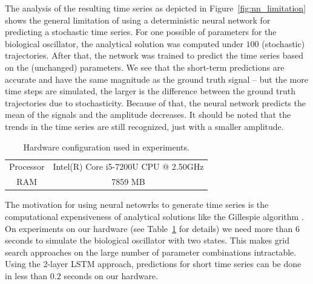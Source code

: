 \documentclass{article}
\begin{document}
The analysis of the resulting time series as depicted in 
Figure~\ref{fig:nn_limitation} shows the general limitation of using a
deterministic neural network for predicting a stochastic time series. For one 
possible of parameters for the biological oscillator, the analytical solution 
was computed under $100$ (stochastic) trajectories. After that, the network was 
trained to predict the time series based on the (unchanged) parameters. We see 
that the short-term predictions are accurate and have the same magnitude as the
ground truth signal -- but the more time steps are simulated, the larger is the
difference between the ground truth trajectories due to stochasticity. Because
of that, the neural network predicts the mean of the signals and the amplitude
decreases. It should be noted that the trends in the time series are still 
recognized, just with a smaller amplitude.

\begin{table}
  \centering
  \begin{tabular}{cc}
    Processor & Intel(R) Core i5-7200U CPU @ 2.50GHz \\
    RAM & 7859 MB \\
  \end{tabular}
  \caption{Hardware configuration used in experiments.}
  \label{tab:hardware}
\end{table}

The motivation for using neural netowrks to generate time series is the 
computational expensiveness of analytical solutions like the Gillespie 
algorithm \cite{gillespie1977}. On experiments on our hardware 
(see Table~\ref{tab:hardware} for details) 
we need more than 6 seconds to simulate the biological oscillator with two
states. This makes grid search approaches on the large number of parameter 
combinations intractable. Using the 2-layer LSTM approach, predictions for 
short time series can be done in less than $0.2$ seconds on our hardware.
\end{document}
